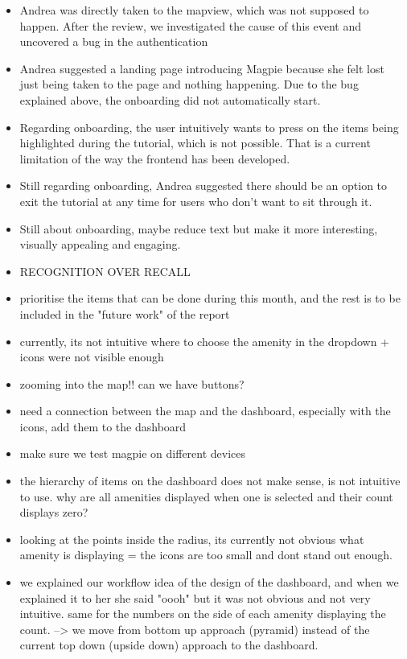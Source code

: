 \documentclass{report}
\begin{document}
\begin{itemize}
    \item Andrea was directly taken to the mapview, which was not supposed to happen. After the review, we investigated the cause of this event and uncovered a bug in the authentication
    \item Andrea suggested a landing page introducing Magpie because she felt lost just being taken to the page and nothing happening. Due to the bug explained above, the onboarding did not automatically start.
    \item Regarding onboarding, the user intuitively wants to press on the items being highlighted during the tutorial, which is not possible. That is a current limitation of the way the frontend has been developed.
    \item Still regarding onboarding, Andrea suggested there should be an option to exit the tutorial at any time for users who don't want to sit through it.
    \item Still about onboarding, maybe reduce text but make it more interesting, visually appealing and engaging.
    \item RECOGNITION OVER RECALL
    \item prioritise the items that can be done during this month, and the rest is to be included in the "future work" of the report
    \item currently, its not intuitive where to choose the amenity in the dropdown + icons were not visible enough
    \item zooming into the map!! can we have buttons?
    \item need a connection between the map and the dashboard, especially with the icons, add them to the dashboard
    \item make sure we test magpie on different devices
    \item the hierarchy of items on the dashboard does not make sense, is not intuitive to use. why are all amenities displayed when one is selected and their count displays zero?
    \item looking at the points inside the radius, its currently not obvious what amenity is displaying = the icons are too small and dont stand out enough.
    \item we explained our workflow idea of the design of the dashboard, and when we explained it to her she said "oooh" but it was not obvious and not very intuitive. same for the numbers on the side of each amenity displaying the count. --> we move from bottom up approach (pyramid) instead of the current top down (upside down) approach to the dashboard.

\end{itemize}
\end{document}
